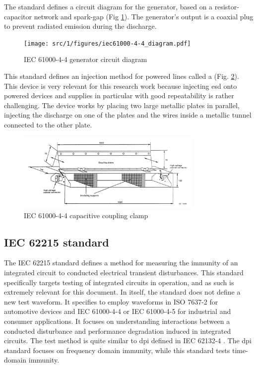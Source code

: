 The standard defines a circuit diagram for the generator, based on a resistor-capacitor network and spark-gap (Fig \ref{fig:iec_4_4_generator}).
The generator's output is a coaxial plug to prevent radiated emission during the discharge.

\begin{figure}[!h]
  \centering
  \texttt{[image: src/1/figures/iec61000-4-4\_diagram.pdf]}
  \caption{IEC 61000-4-4 generator circuit diagram}
  \label{fig:iec_4_4_generator}
\end{figure}

This standard defines an injection method for powered lines called a  (Fig. \ref{fig:iec_4_4_clamp}).
This device is very relevant for this research work because injecting \gls{esd} onto powered devices and supplies in particular with good repeatability is rather challenging.
The device works by placing two large metallic plates in parallel, injecting the discharge on one of the plates and the wires inside a metallic tunnel connected to the other plate.

\begin{figure}[!h]
  \centering
  \includegraphics[width=0.8\textwidth]{src/1/figures/iec61000-4-4_clamp.png}
  \caption{IEC 61000-4-4 capacitive coupling clamp}
  \label{fig:iec_4_4_clamp}
\end{figure}

\subsection{IEC 62215 standard}

The IEC 62215 standard \cite{iec62215} defines a method for measuring the immunity of an integrated circuit to conducted electrical transient disturbances.
This standard specifically targets testing of integrated circuits in operation, and as such is extremely relevant for this document.
In itself, the standard does not define a new test waveform.
It specifies to employ waveforms in ISO 7637-2 \cite{iso7637-2} for automotive devices and IEC 61000-4-4 \cite{iec61000-4-4} or IEC 61000-4-5 for industrial and consumer applications.
It focuses on understanding interactions between a conducted disturbance and performance degradation induced in integrated circuits.
The test method is quite similar to \gls{dpi} defined in IEC 62132-4 \cite{iec62132-4}.
The \gls{dpi} standard focuses on frequency domain immunity, while this standard tests time-domain immunity.

